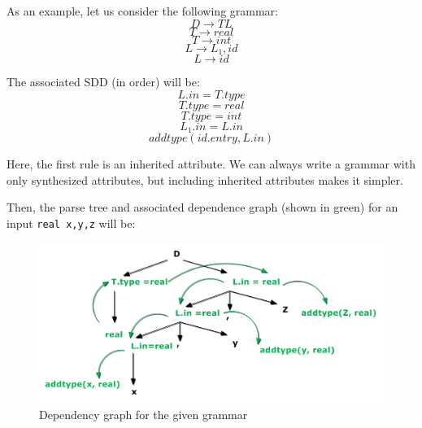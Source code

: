 \documentclass[12pt,letterpaper]{amsbook}
\theoremstyle{definition}
\begin{document}
As an example, let us consider the following grammar:
\[D \rightarrow TL\]
\[T \rightarrow real\]
\[T \rightarrow int\]
\[L \rightarrow L_1,id\]
\[L \rightarrow id\]

The associated SDD (in order) will be:
\[L.in = T.type\]
\[T.type = real\]
\[T.type = int\]
\[L_1.in = L.in\]
\[addtype(id.entry,L.in)\]

Here, the first rule is an inherited attribute. We can always write a grammar with only synthesized attributes, but including inherited attributes makes it simpler.

Then, the parse tree and associated dependence graph (shown in green) for an input \texttt{real x,y,z} will be:

\begin{figure}[htpb]
  \centering
  \includegraphics[width=0.8\linewidth]{./assets/dep_graph_eg.png}
  \caption{Dependency graph for the given grammar}%
  \label{fig:}
\end{figure}
\end{document}
